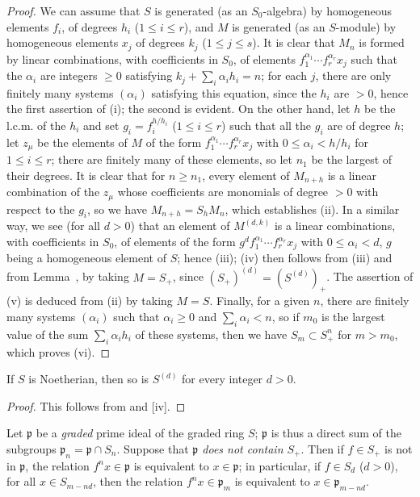 \begin{proof}
We can assume that $S$ is generated (as an $S_0$-algebra) by homogeneous elements $f_i$, of degrees $h_i$ ($1\leq i\leq r$), and $M$ is generated (as an $S$-module) by homogeneous elements $x_j$ of degrees $k_j$ ($1\leq j\leq s$).
It is clear that $M_n$ is formed by linear combinations,
with coefficients in $S_0$, of elements $f_1^{\alpha_1}\cdots f_r^{\alpha_r}x_j$ such that the $\alpha_i$ are integers $\geq 0$ satisfying $k_j+\sum_i\alpha_i h_i=n$;
for each $j$, there are only finitely many systems $(\alpha_i)$ satisfying this equation, since the $h_i$ are $>0$, hence the first assertion of (i);
the second is evident.
On the other hand, let $h$ be the l.c.m. of the $h_i$ and set $g_i=f_i^{h/h_i}$ ($1\leq i\leq r$) such that all the $g_i$ are of degree $h$;
let $z_\mu$ be the elements of $M$ of the form $f_1^{\alpha_1}\cdots f_r^{\alpha_r}x_j$ with $0\leq\alpha_i<h/h_i$ for $1\leq i\leq r$;
there are finitely many of these elements, so let $n_1$ be the largest of their degrees.
It is clear that for $n\geq n_1$, every element of $M_{n+h}$ is a linear combination of the $z_\mu$ whose coefficients are monomials of degree $>0$ with respect to the $g_i$, so we have $M_{n+h}=S_h M_n$, which establishes (ii).
In a similar way, we see (for all $d>0$) that an element of $M^{(d,k)}$ is a linear combinations, with coefficients in $S_0$, of elements of the form $g^d f_1^{\alpha_1}\cdots f_r^{\alpha_r}x_j$ with $0\leq\alpha_i<d$, $g$ being a homogeneous element of $S$;
hence (iii);
(iv) then follows from (iii) and from Lemma~, by taking $M=S_+$, since $(S_+)^{(d)}=(S^{(d)})_+$.
The assertion of (v) is deduced from (ii) by taking $M=S$.
Finally, for a given $n$, there are finitely many systems $(\alpha_i)$ such that $\alpha_i\geq 0$ and $\sum_i\alpha_i<n$, so if $m_0$ is the largest value of the sum $\sum_i\alpha_i h_i$ of these systems, then we have $S_m\subset S_+^n$ for $m>m_0$, which proves (vi).
\end{proof}

\begin{corollary}[2.1.7]
\label{II.2.1.7}
If $S$ is Noetherian, then so is $S^{(d)}$ for every integer $d>0$.
\end{corollary}

\begin{proof}
This follows from  and [iv].
\end{proof}

\begin{env}[2.1.8]
\label{II.2.1.8}
Let $\mathfrak{p}$ be a \emph{graded} prime ideal of the graded ring $S$;
$\mathfrak{p}$ is thus a direct sum of the subgroups $\mathfrak{p}_n=\mathfrak{p}\cap S_n$.
Suppose that \emph{$\mathfrak{p}$ does not contain $S_+$}.
Then if $f\in S_+$ is not in $\mathfrak{p}$, the relation $f^n x\in\mathfrak{p}$ is equivalent to $x\in\mathfrak{p}$;
in particular, if $f\in S_d$ ($d>0$), for all $x\in S_{m-nd}$, then the relation $f^n x\in\mathfrak{p}_m$ is equivalent to $x\in\mathfrak{p}_{m-nd}$.
\end{env}

